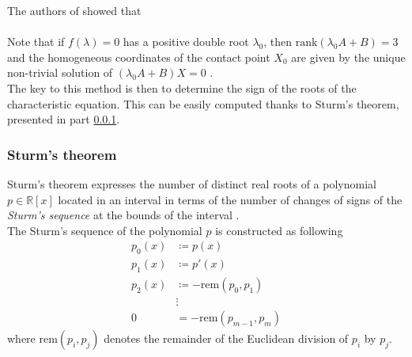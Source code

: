 \documentclass[class=report, float=false, crop=false]{standalone}
\begin{document}
The authors of \cite{wang2001algebraic} showed that\\
\mbox{}\\
Note that if $f(\lambda) = 0$ has a positive double root $\lambda_0$, then $\text{rank}(\lambda_0A + B) = 3$ and the homogeneous coordinates of the contact point $X_0$ are given by the unique non-trivial solution of $(\lambda_0A+B)X=0$ \cite{choi2009continuous}.\\

The key to this method is then to determine the sign of the roots of the characteristic equation. This can be easily computed thanks to Sturm's theorem, presented in part \ref{sturm}.

\subsubsection{Sturm's theorem}
\label{sturm}

Sturm's theorem expresses the number of distinct real roots of a polynomial $p \in \mathbb{R}[x]$ located in an interval in terms of the number of changes of signs of the \textit{Sturm's sequence} at the bounds of the interval \cite{wiki:sturm}.\\

The Sturm's sequence of the polynomial $p$ is constructed as following
\begin{equation}
\begin{aligned}
p_0(x) &\coloneqq p(x)\\
p_1(x) &\coloneqq p'(x)\\
p_2(x) &\coloneqq -\text{rem}(p_0,p_1)\\
&\vdots\\
0 &= -\text{rem}(p_{m-1},p_m)
\end{aligned}
\label{sturm_sequence}
\end{equation}
where $\text{rem}(p_i,p_j)$ denotes the remainder of the Euclidean division of $p_i$ by $p_j$.\\
\end{document}
